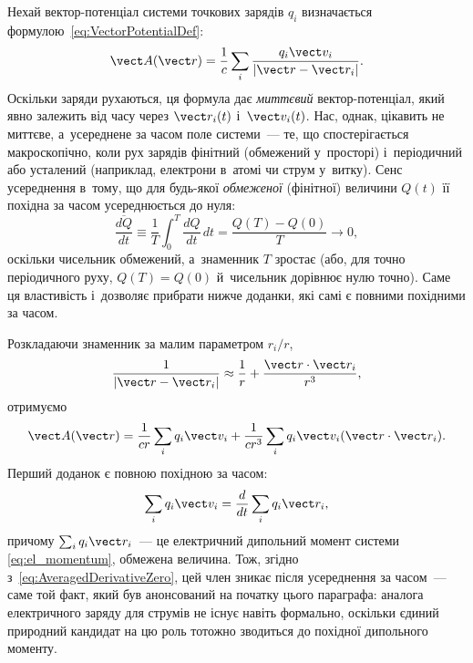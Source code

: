 Нехай вектор-потенціал системи точкових зарядів $q_i$ визначається
формулою~\eqref{eq:VectorPotentialDef}:
\begin{equation*}
	\vect A(\vect r) = \frac{1}{c}\sum_i \frac{q_i\vect v_i}{|\vect r - \vect r_i|}.
\end{equation*}
Оскільки заряди рухаються, ця формула дає \emph{миттєвий} вектор-по\-тен\-ці\-ал, який
явно залежить від часу через $\vect r_i(t)$ і~$\vect v_i(t)$. Нас, однак, цікавить не
миттєве, а~усереднене за часом поле системи~--- те, що спостерігається макроскопічно, коли
рух зарядів фінітний (обмежений у~просторі) і~періодичний або усталений (наприклад,
електрони в~атомі чи струм у~витку). Сенс усереднення в~тому, що для будь-якої
\emph{обмеженої} (фінітної) величини $Q(t)$ її похідна за часом усереднюється до нуля:
\begin{equation}\label{eq:AveragedDerivativeZero}
	\overline{\frac{dQ}{dt}} \equiv \frac{1}{T}\int_0^T \frac{dQ}{dt}\,dt = \frac{Q(T)-Q(0)}{T} \to 0,
\end{equation}
оскільки чисельник обмежений, а~знаменник $T$ зростає (або, для точно періодичного руху,
$Q(T)=Q(0)$ й~чисельник дорівнює нулю точно). Саме ця властивість і~дозволяє прибрати
нижче доданки, які самі є повними похідними за часом.

Розкладаючи знаменник за малим параметром $r_i/r$,
\begin{equation*}
	\frac{1}{|\vect r-\vect r_i|} \approx \frac{1}{r} + \frac{\vect r\cdot\vect r_i}{r^3},
\end{equation*}
отримуємо
\begin{equation}\label{eq:VectorPotentialTwoTerms}
	\vect A(\vect r) = \frac{1}{cr}\sum_i q_i\vect v_i + \frac{1}{cr^3}\sum_i q_i\vect v_i(\vect r\cdot\vect r_i).
\end{equation}
Перший доданок є повною похідною за часом:
\begin{equation*}
	\sum_i q_i\vect v_i = \frac{d}{dt}\sum_i q_i\vect r_i,
\end{equation*}
причому $\sum_i q_i\vect r_i$~--- це електричний дипольний момент системи
\eqref{eq:el_momentum}, обмежена величина. Тож, згідно
з~\eqref{eq:AveragedDerivativeZero}, цей член зникає після усереднення за часом~--- саме
той факт, який був анонсований на початку цього параграфа: аналога електричного заряду для
струмів не існує навіть формально, оскільки єдиний природний кандидат на цю роль тотожно
зводиться до похідної дипольного моменту.

